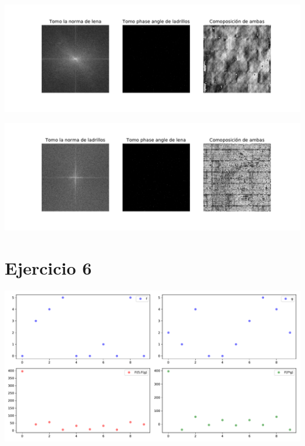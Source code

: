 \documentclass[a4paper]{article}
\begin{document}
\begin{center}

\includegraphics[scale=0.6]{imgs/4a.pdf}

\includegraphics[scale=0.6]{imgs/4b.pdf}
\end{center}

\section{Ejercicio 6}
\begin{center}

	\includegraphics[scale=0.5]{imgs/6.pdf}
\end{center}
\end{document}
